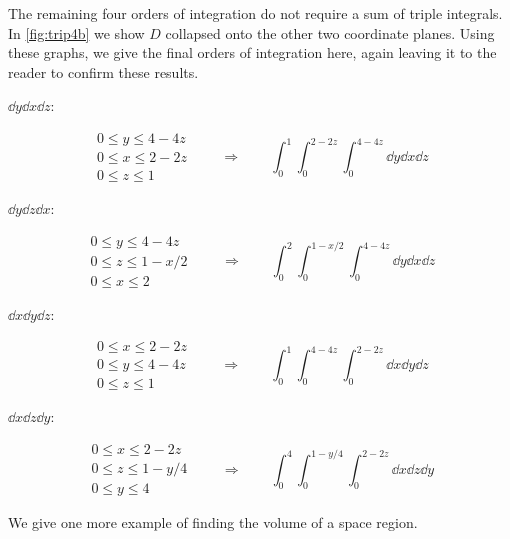 \begin{example}
The remaining four orders of integration do not require a sum of triple integrals. In \autoref{fig:trip4b} we show $D$ collapsed onto the other two coordinate planes. Using these graphs, we give the final orders of integration here, again leaving it to the reader to confirm these results.

\noindent $\dd y\dd x\dd z$:\\[-\baselineskip]\parbox[t]{\linewidth}{%
\[
 \begin{gathered}
  0\leq y\leq 4-4z\\
  0\leq x\leq 2-2z\\
  0\leq z\leq 1
 \end{gathered} 
 \qquad\Rightarrow\qquad
 \int_0^1\int_{0}^{2-2z}\int_0^{4-4z}\dd y\dd x\dd z 
\]}
\noindent $\dd y\dd z\dd x$:\\[-\baselineskip]\parbox[t]{\linewidth}{%
\[
 \begin{gathered}
  0\leq y\leq 4-4z\\
  0\leq z\leq 1-x/2\\
  0\leq x\leq 2
 \end{gathered}
 \qquad\Rightarrow\qquad
 \int_0^2\int_{0}^{1-x/2}\int_0^{4-4z}\dd y\dd x\dd z 
\]}
\noindent $\dd x\dd y\dd z$:\\[-\baselineskip]\parbox[t]{\linewidth}{%
\[
 \begin{gathered}
  0\leq x\leq 2-2z\\
  0\leq y\leq 4-4z\\
  0\leq z\leq 1
 \end{gathered}
 \qquad\Rightarrow\qquad
 \int_0^1\int_{0}^{4-4z}\int_0^{2-2z}\dd x\dd y\dd z 
\]}
\noindent $\dd x\dd z\dd y$:\\[-\baselineskip]\parbox[t]{\linewidth}{%
\[
 \begin{gathered}
  0\leq x\leq 2-2z\\
  0\leq z\leq 1-y/4\\
  0\leq y\leq 4
 \end{gathered}
 \qquad\Rightarrow\qquad
 \int_0^4\int_{0}^{1-y/4}\int_0^{2-2z}\dd x\dd z\dd y
\]}
\end{example}

We give one more example of finding the volume of a space region.

